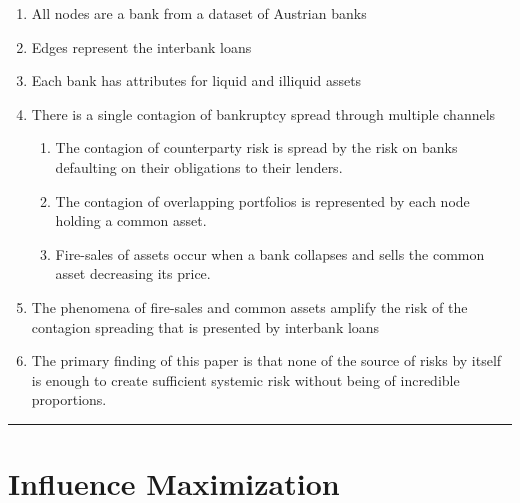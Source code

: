 \documentclass[11pt]{article}
\begin{document}
\begin{enumerate}
    \item All nodes are a bank from a dataset of Austrian banks
    \item Edges represent the interbank loans
    \item Each bank has attributes for liquid and illiquid assets
    \item There is a single contagion of bankruptcy spread through multiple channels
    \begin{enumerate}
    \item The contagion of counterparty risk is spread by the risk on banks defaulting on their obligations to their lenders.
    \item The contagion of overlapping portfolios is represented by each node holding a common asset.
    \item Fire-sales of assets occur when a bank collapses and sells the common asset decreasing its price.
    \end{enumerate}
    \item The phenomena of fire-sales and common assets amplify the risk of the contagion spreading that is presented by interbank loans
    \item The primary finding of this paper is that none of the source of risks by itself is enough to create sufficient systemic risk without being of incredible proportions.
\end{enumerate}
\smallskip

\noindent
\rule{\textwidth}{0.01in}

\clearpage

\section{Influence Maximization}
\noindent
\end{document}
